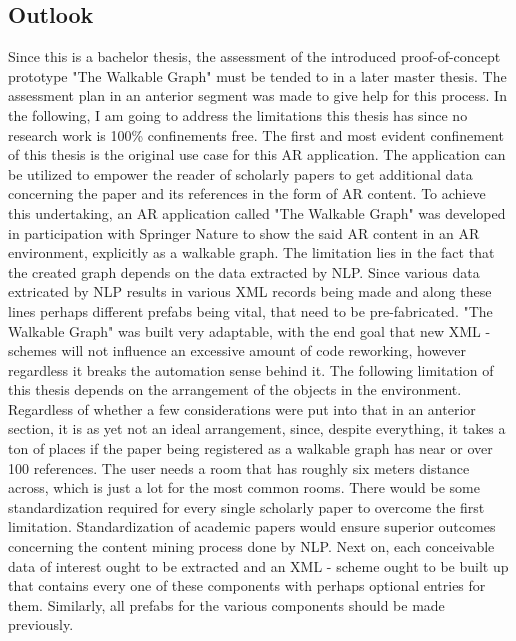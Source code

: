 \documentclass[12pt,a4paper,oneside,american,parskip=half]{article}
\begin{document}
\begin{justify}
\begin{normalsize}
\subsection{Outlook}
Since this is a bachelor thesis, the assessment of the introduced proof-of-concept prototype "The Walkable Graph" must be tended to in a later master thesis. The assessment plan in an anterior segment was made to give help for this process.
\newline
In the following, I am going to address the limitations this thesis has since no research work is 100\% confinements free. The first and most evident confinement of this thesis is the original use case for this AR application. The application can be utilized to empower the reader of scholarly papers to get additional data concerning the paper and its references in the form of AR content. To achieve this undertaking, an AR application called "The Walkable Graph" was developed in participation with Springer Nature to show the said AR content in an AR environment, explicitly as a walkable graph.
The limitation lies in the fact that the created graph depends on the data extracted by NLP. Since various data extricated by NLP results in various XML records being made and along these lines perhaps different prefabs being vital, that need to be pre-fabricated.
\newline
"The Walkable Graph" was built very adaptable, with the end goal that new XML - schemes will not influence an excessive amount of code reworking, however regardless it breaks the automation sense behind it. The following limitation of this thesis depends on the arrangement of the objects in the environment. Regardless of whether a few considerations were put into that in an anterior section, it is as yet not an ideal arrangement, since, despite everything, it takes a ton of places if the paper being registered as a walkable graph has near or over 100 references. 
The user needs a room that has roughly six meters distance across, which is just a lot for the most common rooms.
\newline
There would be some standardization required for every single scholarly paper to overcome the first limitation.
Standardization of academic papers would ensure superior outcomes concerning the content mining process done by NLP. Next on, each conceivable data of interest ought to be extracted and an XML - scheme ought to be built up that contains every one of these components with perhaps optional entries for them. Similarly, all prefabs for the various components should be made previously.

\end{normalsize}
\end{justify}
\end{document}

